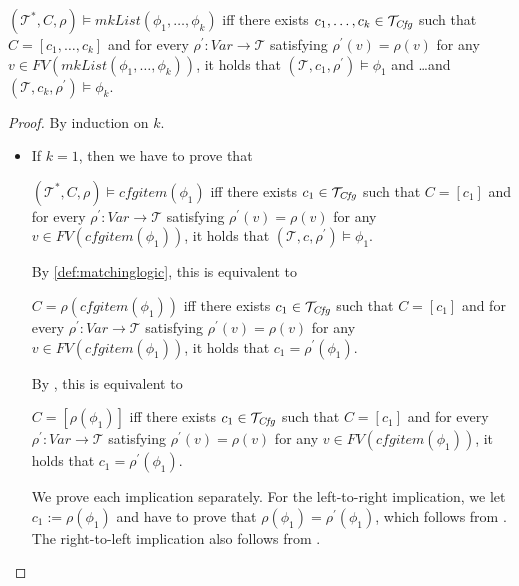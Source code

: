 \begin{lemma}\label{lem:mkListSemantics}
$(\mathcal{T}^*, C, \rho) \vDash \mathit{mkList}(\phi_1,\ldots,\phi_k)$
iff there exists $c_1, \ldots, c_k \in \mathcal{T}_{\mathit{Cfg}}$ such that $C = [c_1, \ldots, c_k]$ and for every $\rho^\prime : \mathit{Var} \to \mathcal{T}$ satisfying
$\rho^\prime(v) = \rho(v)$ for any \\
$v \in \mathit{FV}(\mathit{mkList}(\phi_1, \ldots, \phi_k))$,
it holds that 
$(\mathcal{T}, c_1, \rho^\prime) \vDash \phi_1$ and \ldots and $(\mathcal{T}, c_k, \rho^\prime) \vDash \phi_k$.
\end{lemma}
\begin{proof}
By induction on $k$.
\begin{itemize}
    \item If $k = 1$, then we have to prove that
    \begin{proofenv}
    $(\mathcal{T}^*, C, \rho) \vDash \mathit{cfgitem}(\phi_1)$
    iff there exists $c_1 \in \mathcal{T}_{\mathit{Cfg}}$ such that $C = [c_1]$ and for every $\rho^\prime : \mathit{Var} \to \mathcal{T}$ satisfying
    $\rho^\prime(v) = \rho(v)$ for any $v \in \mathit{FV}(\mathit{cfgitem}(\phi_1))$, it holds that
    $(\mathcal{T}, c, \rho^\prime) \vDash \phi_1$.
    \end{proofenv}
    By \cref{def:matchinglogic}, this is equivalent to
    \begin{proofenv}
    $C = \rho(\mathit{cfgitem}(\phi_1))$
    iff there exists $c_1 \in \mathcal{T}_{\mathit{Cfg}}$ such that $C = [c_1]$ and for every $\rho^\prime : \mathit{Var} \to \mathcal{T}$ satisfying
    $\rho^\prime(v) = \rho(v)$ for any $v \in \mathit{FV}(\mathit{cfgitem}(\phi_1))$, it holds that
    $c_1 = \rho^\prime(\phi_1)$.
    \end{proofenv}
    By , this is equivalent to
    \begin{proofenv}
    $C = [\rho(\phi_1)]$
    iff there exists $c_1 \in \mathcal{T}_{\mathit{Cfg}}$ such that $C = [c_1]$ and for every $\rho^\prime : \mathit{Var} \to \mathcal{T}$ satisfying
    $\rho^\prime(v) = \rho(v)$ for any $v \in \mathit{FV}(\mathit{cfgitem}(\phi_1))$, it holds that
    $c_1 = \rho^\prime(\phi_1)$.
    \end{proofenv}
    We prove each implication separately.
    For the left-to-right implication, we let $c_1 := \rho(\phi_1)$
    and have to prove that $\rho(\phi_1) = \rho^\prime(\phi_1)$, which follows from .
    The right-to-left implication also follows from  .
    

\end{itemize}
\end{proof}
